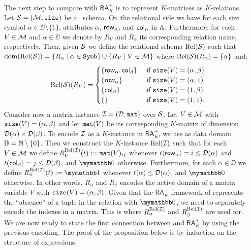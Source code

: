 The next step to compare \langsum with $\mathsf{RA}_{K}^+$  is to represent $K$-matrices as $K$-relations.
Let $\mathcal{S}=(\mathcal{M},\texttt{size})$ be a \lang\ schema. On the relational side
we have for each size symbol $\alpha\in\DD\setminus\{1\}$, attributes $\alpha$, $\mathsf{row}_\alpha$, and $\mathsf{col}_\alpha$ in $\mathbb{A}$. Furthermore, for each $V\in\mathcal{M}$ and $\alpha \in \DD$ we denote
by $R_V$ and $R_\alpha$ its corresponding relation name, respectively. Then, given $\mathcal{S}$ we define the relational schema $\text{Rel}(\mathcal{S})$ such that $\operatorname{dom}(\text{Rel}(\mathcal{S})) =  \{R_\alpha \mid \alpha\in\texttt{Symb}\} \cup \{R_V \mid V \in \mathcal{M}\}$ where $\text{Rel}(\mathcal{S})(R_\alpha) = \{\alpha\}$ and:
\[
\text{Rel}(\mathcal{S})(R_V) = \begin{cases}
\lbrace\mathsf{row}_\alpha,\mathsf{col}_\beta \rbrace & \text{ if $ \texttt{size}(V)=(\alpha,\beta)$} \\
\lbrace\mathsf{row}_\alpha \rbrace & \text{ if $ \texttt{size}(V)=(\alpha,1)$} \\
\lbrace\mathsf{col}_\beta \rbrace  &
\text{ if $ \texttt{size}(V)=(1,\beta)$} \\
\lbrace\rbrace & \text{ if $\texttt{size}(V)=(1,1)$}.
\end{cases}
\]
Consider now a matrix instance $\mathcal{I} = (\mathcal{D},\texttt{mat})$ over $\mathcal{S}$.
Let $V\in\mathcal{M}$ with $\texttt{size}(V)=(\alpha,\beta)$ and let $\texttt{mat}(V)$ be its corresponding $K$-matrix of dimension $\mathcal{D}(\alpha)\times \mathcal{D}(\beta)$.
To encode $\mathcal{I}$ as a $K$-instance in $\mathsf{RA}_{K}^+$, we use as data domain $\mathbb{D} = \mathbb{N} \setminus \{0\}$. Then we construct the $K$-instance $\text{Rel}(\mathcal{I})$ such that for each $V\in\mathcal{M}$ we define 
$R_V^{\text{Rel}(\mathcal{I})}(t):=\texttt{mat}(V)_{ij}$ whenever $t(\mathsf{row}_\alpha) = i \leq \mathcal{D}(\alpha)$ and $t(\mathsf{col}_\beta) = j \leq \mathcal{D}(\beta)$, and $\kzero$ otherwise. Furthermore, for each $\alpha \in \DD$ we define $R_\alpha^{\text{Rel}(\I)}(t):=\kone$ whenever $t(\alpha) \leq \mathcal{D}(\alpha)$, and $\kzero$ otherwise. In other words, $R_\alpha$ and $R_\beta$ encodes the active domain of a matrix variable $V$ with $\texttt{size}(V)=(\alpha,\beta)$. Given that the $\mathsf{RA}_{K}^+$ framework of \cite{GreenKT07} represents the ``absence'' of a tuple in the relation with $\kzero$, we need to separately encode the indexes in a matrix.
This is where $R_\alpha^{\text{Rel}(\mathcal{I})}$ and $R_\beta^{\text{Rel}(\mathcal{I})}$ are used for.
%
%
We are now ready to state the first connection between \langsum and $\mathsf{RA}_{K}^+$  by using the previous encoding. The proof of the proposition below is by induction on the structure of expressions.
